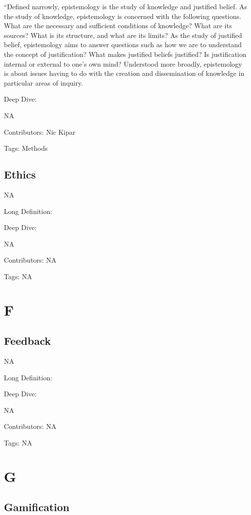 \documentclass[
  letterpaper,
  DIV=11,
  numbers=noendperiod]{scrreprt}
\begin{document}
``Defined narrowly, epistemology is the study of knowledge and justified
belief. As the study of knowledge, epistemology is concerned with the
following questions. What are the necessary and sufficient conditions of
knowledge? What are its sources? What is its structure, and what are its
limits? As the study of justified belief, epistemology aims to answer
questions such as how we are to understand the concept of justification?
What makes justified beliefs justified? Is justification internal or
external to one's own mind? Understood more broadly, epistemology is
about issues having to do with the creation and dissemination of
knowledge in particular areas of inquiry.

Deep Dive:

NA

Contributors: Nic Kipar

Tags: Methods

\section{Ethics}\label{ethics}

NA

Long Definition:

Deep Dive:

NA

Contributors: NA

Tags: NA


\chapter{F}\label{f}

\section{Feedback}\label{feedback}

NA

Long Definition:

Deep Dive:

NA

Contributors: NA

Tags: NA


\chapter{G}\label{g}

\section{Gamification}\label{gamification}
\end{document}
